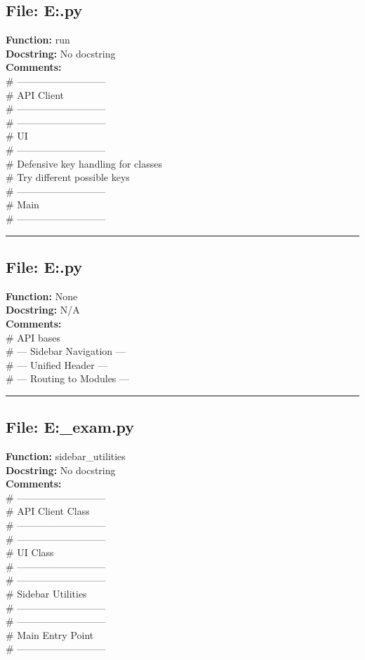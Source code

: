 {\subsection*{File: E:\project\capstone\frontend\faculty\attendence.py}
\textbf{Function:} run\\
\textbf{Docstring:} No docstring\\
\textbf{Comments:}\\
# ---------------------------\\
# API Client\\
# ---------------------------\\
# ---------------------------\\
# UI\\
# ---------------------------\\
# Defensive key handling for classes\\
# Try different possible keys\\
# ---------------------------\\
# Main\\
# ---------------------------\\

\hrule

\subsection*{File: E:\project\capstone\frontend\faculty\main.py}
\textbf{Function:} None\\
\textbf{Docstring:} N/A\\
\textbf{Comments:}\\
# API bases\\
# --- Sidebar Navigation ---\\
# --- Unified Header ---\\
# --- Routing to Modules ---\\

\hrule

\subsection*{File: E:\project\capstone\frontend\faculty\mst_exam.py}
\textbf{Function:} sidebar_utilities\\
\textbf{Docstring:} No docstring\\
\textbf{Comments:}\\
# ---------------------------\\
# API Client Class\\
# ---------------------------\\
# ---------------------------\\
# UI Class\\
# ---------------------------\\
# ---------------------------\\
# Sidebar Utilities\\
# ---------------------------\\
# ---------------------------\\
# Main Entry Point\\
# ---------------------------\\

}

